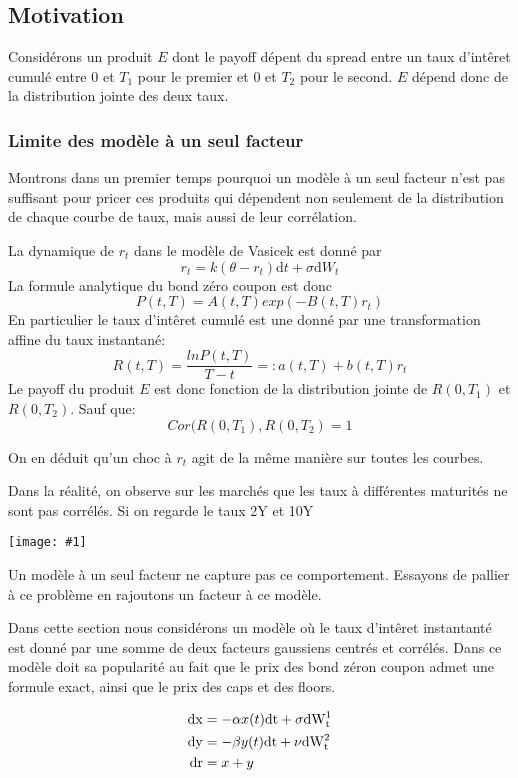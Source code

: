 \documentclass[paper=a4, fontsize=11pt]{scrartcl}
\numberwithin{equation}{section}		%
\numberwithin{figure}{section}			%
\numberwithin{table}{section}				%
\theoremstyle{definition}
\newcommand{\IMG}[3]{
  \begin{center}
    \texttt{[image: \#1]}%
    \end{center}
}
\begin{document}
\subsection{Motivation}


Considérons un produit $E$ dont le payoff  dépent  du spread entre un taux d'intêret cumulé entre $0$ et $T_1$ pour le premier et $0$ et $T_2$ pour le second. $E$ dépend donc de la distribution jointe des deux taux.

\subsubsection*{Limite des modèle à un seul facteur}
Montrons dans un premier temps pourquoi un modèle à un seul facteur n'est pas suffisant pour pricer ces produits qui dépendent non seulement de la distribution de chaque courbe de taux, mais aussi de leur corrélation. 

La dynamique de $r_t$ dans le modèle de Vasicek est donné par
$$r_t = k(\theta - r_t)  \mathrm{d}t  + \sigma \mathrm{d}W_t$$
La formule analytique du bond zéro coupon est donc
$$P(t, T) = A(t, T) exp(-B(t, T) r_t)$$
En particulier le taux d'intêret cumulé est une donné par une transformation affine du taux instantané:
$$R(t, T) = \frac{ln P(t, T)}{T-t} =: a(t, T) + b(t, T) r_t$$
Le payoff du produit $E$ est donc fonction de la distribution jointe de $R(0, T_1)$ et $R(0, T_2)$. Sauf que:
$$Cor(R(0, T_1), R(0, T_2) = 1$$

On en déduit qu'un choc à $r_t$ agit de la même manière sur toutes les courbes.

Dans la réalité, on observe sur les marchés que les taux à différentes maturités ne sont pas corrélés. Si on regarde le taux 2Y et 10Y

\IMG{img/libor.png}{Libor}{1}

Un modèle à un seul facteur ne capture pas ce comportement. Essayons de pallier à ce problème en rajoutons un facteur à ce modèle.

Dans cette section nous considérons un modèle où le taux d'intêret instantanté est donné par une somme de deux facteurs gaussiens centrés et corrélés. Dans ce modèle doit sa popularité au fait que le prix des bond zéron coupon admet une formule exact, ainsi que le prix des caps et des floors.


\begin{align*}
  \rm{d}x &= -\alpha x(t) \rm{d}t + \sigma \rm{d}W^1_t \\
  \rm{d}y &= -\beta y(t) \rm{d}t + \nu \rm{d}W^2_t \\
  \rm{d}r &= x + y 
\end{align*}
\end{document}
